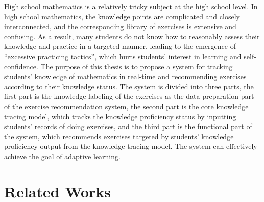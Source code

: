 
High school mathematics is a relatively tricky subject at the high school level. In high school mathematics, the knowledge points are complicated and closely interconnected, and the corresponding library of exercises is extensive and confusing. As a result, many students do not know how to reasonably assess their knowledge and practice in a targeted manner, leading to the emergence of ``excessive practicing tactics'', which hurts students' interest in learning and self-confidence. The purpose of this thesis is to propose a system for tracking students' knowledge of mathematics in real-time and recommending exercises according to their knowledge status. The system is divided into three parts, the first part is the knowledge labeling of the exercises as the data preparation part of the exercise recommendation system, the second part is the core knowledge tracing model, which tracks the knowledge proficiency status by inputting students' records of doing exercises, and the third part is the functional part of the system, which recommends exercises targeted by students' knowledge proficiency output from the knowledge tracing model. The system can effectively achieve the goal of adaptive learning.

\section{Related Works}






